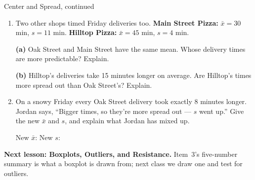 \documentclass[12pt]{article}
\begin{document}
\begin{notesbox}{Center and Spread, continued}
\begin{enumerate}[leftmargin=1.6em, itemsep=5pt, topsep=2pt, start=4]
  \item Two other shops timed Friday deliveries too. \textbf{Main Street Pizza:}
        $\bar{x} = 30$ min, $s = 11$ min. \textbf{Hilltop Pizza:} $\bar{x} = 45$ min,
        $s = 4$ min.

        \par\vspace{3pt}
        \textbf{(a)} Oak Street and Main Street have the same mean. Whose delivery times are
        more predictable? Explain.
        \gradedresponse{\gradedblank[id=q5a, type=rubric, points=1, display={Oak Street: about 4 min from the mean, not 11 --- less spread.}]{\linewidth}{2in}}

        \textbf{(b)} Hilltop's deliveries take 15 minutes longer on average. Are Hilltop's
        times more spread out than Oak Street's? Explain.
        \gradedresponse{\gradedblank[id=q5b, type=rubric, points=1, display={No --- both have $s = 4$. Hilltop is slower, not more spread out.}]{\linewidth}{2in}}

  \item On a snowy Friday every Oak Street delivery took exactly $8$ minutes longer. Jordan
        says, ``Bigger times, so they're more spread out --- $s$ went up.'' Give the new
        $\bar{x}$ and $s$, and explain what Jordan has mixed up.

        \par\vspace{4pt}
        New $\bar{x}$: \blankbox{\gradedblank[id=q6a, type=short, points=0.5, answer={38}, check=numeric, display={38 minutes}]{3cm}{13.5pt}} \qquad New $s$: \blankbox{\gradedblank[id=q6b, type=short, points=0.5, answer={4}, check=numeric, display={4 minutes}]{3cm}{13.5pt}}
        \gradedresponse{\gradedblank[id=q6c, type=rubric, points=1, display={Every time moved up 8, so each deviation from the new mean is unchanged. Bigger times, same spread: $s$ is not about size.}]{\linewidth}{2in}}

\end{enumerate}
\end{notesbox}

\boxguard[5]   %
\begin{spiralbox}
\textbf{Next lesson: Boxplots, Outliers, and Resistance.} Item~3's five-number summary is what a
boxplot is drawn from; next class we draw one and test for outliers.
\end{spiralbox}
\end{document}
